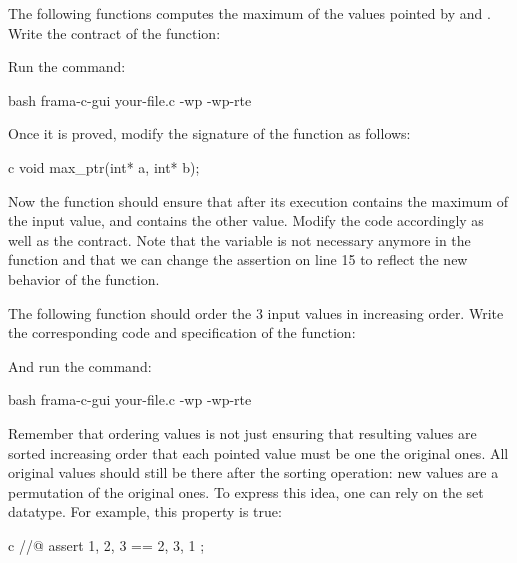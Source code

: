 The following functions computes the maximum of the values pointed by
 and . Write the contract of the function:






Run the command:



\begin{CodeBlock}{bash}
frama-c-gui your-file.c -wp -wp-rte
\end{CodeBlock}



Once it is proved, modify the signature of the function as follows:



\begin{CodeBlock}{c}
void max_ptr(int* a, int* b);
\end{CodeBlock}


Now the function should ensure that after its execution 
contains the maximum of the input value, and  contains the
other value. Modify the code accordingly as well as the contract. Note that
the variable  is not necessary anymore in the 
function and that we can change the assertion on line 15 to reflect the
new behavior of the function.






The following function should order the 3 input values in increasing order.
Write the corresponding code and specification of the function:




And run the command:


\begin{CodeBlock}{bash}
frama-c-gui your-file.c -wp -wp-rte
\end{CodeBlock}


Remember that ordering values is not just ensuring that resulting values
are sorted increasing order that each pointed value must be one the original
ones. All original values should still be there after the sorting operation:
new values are a permutation of the original ones. To express this idea, one
can rely on the set datatype. For example, this property is true:


\begin{CodeBlock}{c}
//@ assert { 1, 2, 3 } == { 2, 3, 1 };
\end{CodeBlock}



